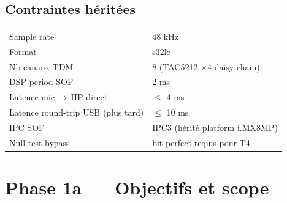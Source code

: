 \documentclass[11pt,a4paper]{article}
\begin{document}
\subsection{Contraintes héritées}
\begin{center}
\begin{tabular}{ll}
\toprule
Sample rate & 48 kHz \\
Format & s32le \\
Nb canaux TDM & 8 (TAC5212 $\times$4 daisy-chain) \\
DSP period SOF & 2 ms \\
Latence mic\,$\rightarrow$\,HP direct & $\leq$ 4 ms \\
Latence round-trip USB (plus tard) & $\leq$ 10 ms \\
IPC SOF & IPC3 (hérité platform i.MX8MP) \\
Null-test bypass & bit-perfect requis pour T4 \\
\bottomrule
\end{tabular}
\end{center}

\clearpage
\section{Phase 1a --- Objectifs et scope}
\end{document}
